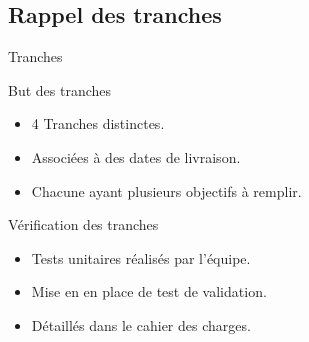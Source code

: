 \documentclass{bredelebeamer}
\begin{document}
\subsection{Rappel des tranches}

\begin{frame}{Tranches}
\begin{block}{But des tranches}
\begin{itemize}
\item 4 Tranches distinctes.
\item Associées à des dates de livraison.
\item Chacune ayant plusieurs objectifs à remplir.
\end{itemize}
\end{block}

\pause

\begin{exampleblock}{Vérification des tranches}
\begin{itemize}
\item Tests unitaires réalisés par l'équipe.
\item Mise en en place de test de validation.
\item Détaillés dans le cahier des charges.
\end{itemize}
\end{exampleblock}
\end{frame}
\end{document}
